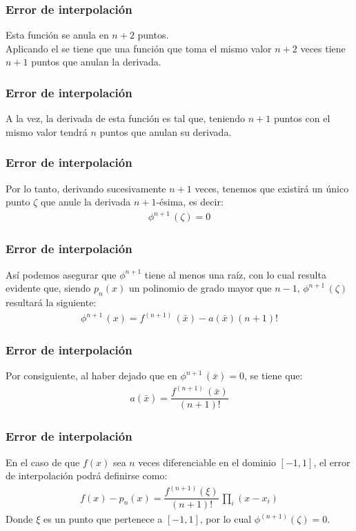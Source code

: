 \documentclass[12pt]{beamer}
\begin{document}
\begin{frame}
\frametitle{Error de interpolación}
Esta función se anula en $n + 2$ puntos. 
\\
\bigskip
\pause
Aplicando el  se tiene que una función que toma el mismo valor $n + 2$ veces tiene $n + 1$ puntos que anulan la derivada.
\end{frame}
\begin{frame}
\frametitle{Error de interpolación}
A la vez, la derivada de esta función es tal que, teniendo $n + 1$ puntos con el mismo valor tendrá $n$ puntos que anulan su derivada. 
\end{frame}
\begin{frame}
\frametitle{Error de interpolación}
Por lo tanto, derivando sucesivamente $n + 1$ veces, tenemos que existirá un único punto $\zeta$ que anule la derivada $n+1$-ésima, es decir:
\pause
\begin{align*}
\phi^{n+1} \, (\zeta) = 0
\end{align*}
\end{frame}
\begin{frame}
\frametitle{Error de interpolación}
Así podemos asegurar que $\phi^{n+1}$ tiene al menos una raíz, \pause con lo cual resulta evidente que, siendo $p_{n}(x)$ un polinomio de grado mayor que $n - 1$, $\phi^{n+1} \, (\zeta)$ resultará la siguiente:
\pause
\begin{align*}
\phi^{n+1} \, (x) = f^{(n+1)} \, (\bar{x}) - a (\bar{x}) (n + 1)!
\end{align*}
\end{frame}
\begin{frame}
\frametitle{Error de interpolación}
Por consiguiente, al haber dejado que en $\phi^{n+1} \, (\bar{x}) = 0$, se tiene que:
\pause
\begin{align*}
a (\bar{x}) = \dfrac{f^{(n+1)} \, (\bar{x})}{(n + 1)!}
\end{align*}
\end{frame}
\begin{frame}
\frametitle{Error de interpolación}
En el caso de que $f(x)$ sea $n$ veces diferenciable en el dominio $[-1, 1]$, el error de interpolación podrá definirse como:
\pause
\begin{align*}
f(x) - p_{n}(x) = \dfrac{f^{(n+1)}(\xi)}{(n + 1)!} \, \prod_{i} (x - x_{i})
\end{align*}
\pause
Donde $\xi$ es un punto que pertenece a $[-1, 1]$, por lo cual $\phi^{(n+1)}(\zeta) = 0$.
\end{frame}
\end{document}
